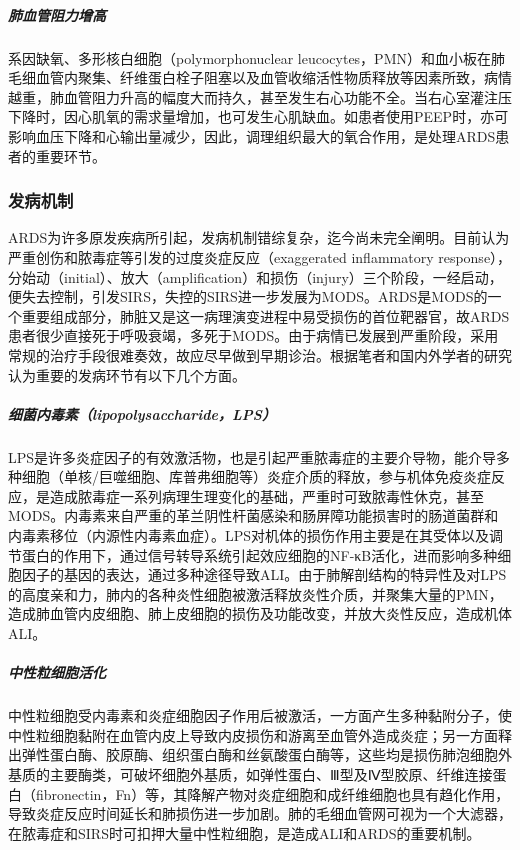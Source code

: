 \subparagraph{肺血管阻力增高}

系因缺氧、多形核白细胞（polymorphonuclear
leucocytes，PMN）和血小板在肺毛细血管内聚集、纤维蛋白栓子阻塞以及血管收缩活性物质释放等因素所致，病情越重，肺血管阻力升高的幅度大而持久，甚至发生右心功能不全。当右心室灌注压下降时，因心肌氧的需求量增加，也可发生心肌缺血。如患者使用PEEP时，亦可影响血压下降和心输出量减少，因此，调理组织最大的氧合作用，是处理ARDS患者的重要环节。

\subsubsection{发病机制}

ARDS为许多原发疾病所引起，发病机制错综复杂，迄今尚未完全阐明。目前认为严重创伤和脓毒症等引发的过度炎症反应（exaggerated
inflammatory
response），分始动（initial）、放大（amplification）和损伤（injury）三个阶段，一经启动，便失去控制，引发SIRS，失控的SIRS进一步发展为MODS。ARDS是MODS的一个重要组成部分，肺脏又是这一病理演变进程中易受损伤的首位靶器官，故ARDS患者很少直接死于呼吸衰竭，多死于MODS。由于病情已发展到严重阶段，采用常规的治疗手段很难奏效，故应尽早做到早期诊治。根据笔者和国内外学者的研究认为重要的发病环节有以下几个方面。

\subparagraph{细菌内毒素（lipopolysaccharide，LPS）}

LPS是许多炎症因子的有效激活物，也是引起严重脓毒症的主要介导物，能介导多种细胞（单核/巨噬细胞、库普弗细胞等）炎症介质的释放，参与机体免疫炎症反应，是造成脓毒症一系列病理生理变化的基础，严重时可致脓毒性休克，甚至MODS。内毒素来自严重的革兰阴性杆菌感染和肠屏障功能损害时的肠道菌群和内毒素移位（内源性内毒素血症）。LPS对机体的损伤作用主要是在其受体以及调节蛋白的作用下，通过信号转导系统引起效应细胞的NF-κB活化，进而影响多种细胞因子的基因的表达，通过多种途径导致ALI。由于肺解剖结构的特异性及对LPS的高度亲和力，肺内的各种炎性细胞被激活释放炎性介质，并聚集大量的PMN，造成肺血管内皮细胞、肺上皮细胞的损伤及功能改变，并放大炎性反应，造成机体ALI。

\subparagraph{中性粒细胞活化}

中性粒细胞受内毒素和炎症细胞因子作用后被激活，一方面产生多种黏附分子，使中性粒细胞黏附在血管内皮上导致内皮损伤和游离至血管外造成炎症；另一方面释出弹性蛋白酶、胶原酶、组织蛋白酶和丝氨酸蛋白酶等，这些均是损伤肺泡细胞外基质的主要酶类，可破坏细胞外基质，如弹性蛋白、Ⅲ型及Ⅳ型胶原、纤维连接蛋白（fibronectin，Fn）等，其降解产物对炎症细胞和成纤维细胞也具有趋化作用，导致炎症反应时间延长和肺损伤进一步加剧。肺的毛细血管网可视为一个大滤器，在脓毒症和SIRS时可扣押大量中性粒细胞，是造成ALI和ARDS的重要机制。

